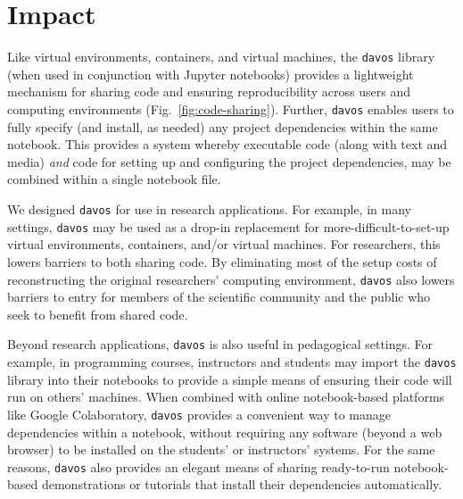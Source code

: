 \documentclass[preprint,12pt,a4paper]{elsarticle}
\begin{document}


\section{Impact}

Like virtual environments, containers, and virtual machines, the
\texttt{davos} library (when used in conjunction with Jupyter
notebooks) provides a light\-weight mechanism for sharing code and
ensuring reproducibility across users and computing environments
(Fig.~\ref{fig:code-sharing}). Further, \texttt{davos} enables users
to fully specify (and install, as needed) any project dependencies
within the same notebook. This provides a system whereby executable
code (along with text and media) \textit{and} code for setting up and
configuring the project dependencies, may be combined within a single
notebook file.

We designed \texttt{davos} for use in research applications. For
example, in many settings, \texttt{davos} may be used as a drop-in
replacement for more-difficult-to-set-up virtual environments,
containers, and/or virtual machines. For researchers, this lowers
barriers to both sharing code. By eliminating most of the setup costs
of reconstructing the original researchers' computing environment,
\texttt{davos} also lowers barriers to entry for members of
the scientific community and the public who seek to benefit
from shared code.

Beyond research applications, \texttt{davos} is also useful in
pedagogical settings. For example, in programming courses,
instructors and students may import the \texttt{davos} library into
their notebooks to provide a simple means of ensuring their code will
run on others' machines. When combined with online notebook-based
platforms like Google Colaboratory, \texttt{davos} provides a
convenient way to manage dependencies within a notebook, without
requiring any software (beyond a web browser) to be installed on the
students' or instructors' systems. For the same reasons,
\texttt{davos} also provides an elegant means of sharing ready-to-run
notebook-based demonstrations or tutorials that install their dependencies
automatically.
\end{document}

